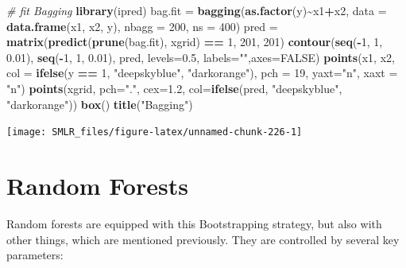 \documentclass[
]{book}
\newenvironment{Shaded}{\begin{snugshade}}{\end{snugshade}}
\newcommand{\AttributeTok}[1]{\textcolor[rgb]{0.13,0.29,0.53}{#1}}
\newcommand{\CommentTok}[1]{\textcolor[rgb]{0.56,0.35,0.01}{\textit{#1}}}
\newcommand{\ConstantTok}[1]{\textcolor[rgb]{0.56,0.35,0.01}{#1}}
\newcommand{\DecValTok}[1]{\textcolor[rgb]{0.00,0.00,0.81}{#1}}
\newcommand{\FloatTok}[1]{\textcolor[rgb]{0.00,0.00,0.81}{#1}}
\newcommand{\FunctionTok}[1]{\textcolor[rgb]{0.13,0.29,0.53}{\textbf{#1}}}
\newcommand{\NormalTok}[1]{#1}
\newcommand{\OtherTok}[1]{\textcolor[rgb]{0.56,0.35,0.01}{#1}}
\newcommand{\SpecialCharTok}[1]{\textcolor[rgb]{0.81,0.36,0.00}{\textbf{#1}}}
\newcommand{\StringTok}[1]{\textcolor[rgb]{0.31,0.60,0.02}{#1}}
\theoremstyle{definition}
\theoremstyle{definition}
\theoremstyle{definition}
\theoremstyle{definition}
\theoremstyle{remark}
\begin{document}
\begin{Shaded}
\begin{Highlighting}[]
  \CommentTok{\# fit Bagging}
  \FunctionTok{library}\NormalTok{(ipred)}
\NormalTok{  bag.fit }\OtherTok{=} \FunctionTok{bagging}\NormalTok{(}\FunctionTok{as.factor}\NormalTok{(y)}\SpecialCharTok{\textasciitilde{}}\NormalTok{x1}\SpecialCharTok{+}\NormalTok{x2, }\AttributeTok{data =} \FunctionTok{data.frame}\NormalTok{(x1, x2, y), }\AttributeTok{nbagg =} \DecValTok{200}\NormalTok{, }\AttributeTok{ns =} \DecValTok{400}\NormalTok{)}
\NormalTok{  pred }\OtherTok{=} \FunctionTok{matrix}\NormalTok{(}\FunctionTok{predict}\NormalTok{(}\FunctionTok{prune}\NormalTok{(bag.fit), xgrid) }\SpecialCharTok{==} \DecValTok{1}\NormalTok{, }\DecValTok{201}\NormalTok{, }\DecValTok{201}\NormalTok{)}
  \FunctionTok{contour}\NormalTok{(}\FunctionTok{seq}\NormalTok{(}\SpecialCharTok{{-}}\DecValTok{1}\NormalTok{, }\DecValTok{1}\NormalTok{, }\FloatTok{0.01}\NormalTok{), }\FunctionTok{seq}\NormalTok{(}\SpecialCharTok{{-}}\DecValTok{1}\NormalTok{, }\DecValTok{1}\NormalTok{, }\FloatTok{0.01}\NormalTok{), pred, }\AttributeTok{levels=}\FloatTok{0.5}\NormalTok{, }\AttributeTok{labels=}\StringTok{""}\NormalTok{,}\AttributeTok{axes=}\ConstantTok{FALSE}\NormalTok{)}
  \FunctionTok{points}\NormalTok{(x1, x2, }\AttributeTok{col =} \FunctionTok{ifelse}\NormalTok{(y }\SpecialCharTok{==} \DecValTok{1}\NormalTok{, }\StringTok{"deepskyblue"}\NormalTok{, }\StringTok{"darkorange"}\NormalTok{), }\AttributeTok{pch =} \DecValTok{19}\NormalTok{, }\AttributeTok{yaxt=}\StringTok{"n"}\NormalTok{, }\AttributeTok{xaxt =} \StringTok{"n"}\NormalTok{)}
  \FunctionTok{points}\NormalTok{(xgrid, }\AttributeTok{pch=}\StringTok{"."}\NormalTok{, }\AttributeTok{cex=}\FloatTok{1.2}\NormalTok{, }\AttributeTok{col=}\FunctionTok{ifelse}\NormalTok{(pred, }\StringTok{"deepskyblue"}\NormalTok{, }\StringTok{"darkorange"}\NormalTok{))}
  \FunctionTok{box}\NormalTok{()}
  \FunctionTok{title}\NormalTok{(}\StringTok{"Bagging"}\NormalTok{)}
\end{Highlighting}
\end{Shaded}

\begin{center}\texttt{[image: SMLR\_files/figure-latex/unnamed-chunk-226-1]} \end{center}

\hypertarget{random-forests-1}{%
\section{Random Forests}\label{random-forests-1}}

Random forests are equipped with this Bootstrapping strategy, but also with other things, which are mentioned previously. They are controlled by several key parameters:
\end{document}
